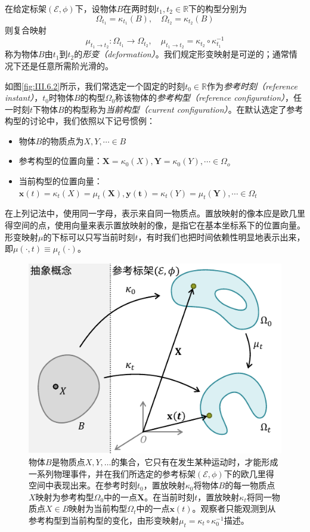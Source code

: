 \documentclass[main.tex]{subfiles}
\begin{document}
在给定标架$\left(\mathcal{E},\phi\right)$下，设物体$B$在两时刻$t_1,t_2\in\mathbb{R}$下的构型分别为
\[\Omega_{t_1}=\kappa_{t_1}\left(B\right),\quad\Omega_{t_2}=\kappa_{t_2}\left(B\right)\]
则复合映射
\[\mu_{t_1\to t_2}:\Omega_{t_1}\rightarrow\Omega_{t_2},\quad\mu_{t_1\to t_2}=\kappa_{t_2}\circ\kappa_{t_1}^{-1}\]
称为物体$B$由$t_1$到$t_2$的\emph{形变（deformation）}。我们规定形变映射是可逆的；通常情况下还是任意所需阶光滑的。

如图\ref{fig:III.6.2}所示，我们常选定一个固定的时刻$t_0\in\mathbb{R}$作为\emph{参考时刻（reference instant）}，$t_0$时物体$B$的构型$\Omega_0$称该物体的\emph{参考构型（reference configuration）}，任一时刻$t$下物体$B$的构型称为\emph{当前构型（current configuration）}。在默认选定了参考构型的讨论中，我们依照以下记号惯例：
\begin{itemize}
    \item 物体$B$的物质点为$X,Y,\cdots\in B$
    \item 参考构型的位置向量：$\mathbf{X}=\kappa_0\left(X\right),\mathbf{Y}=\kappa_0\left(Y\right),\cdots\in\Omega_o$
    \item 当前构型的位置向量：$\mathbf{x}\left(t\right)=\kappa_t\left(X\right)=\mu_t\left(\mathbf{X}\right),\mathbf{y\left(t\right)}=\kappa_t\left(Y\right)=\mu_t\left(\mathbf{Y}\right),\cdots\in\Omega_t$
\end{itemize}
在上列记法中，使用同一字母，表示来自同一物质点。置放映射的像本应是欧几里得空间的点，使用向量来表示置放映射的像，是指它在基本坐标系下的位置向量。形变映射$\mu$的下标可以只写当前时刻$t$，有时我们也把时间依赖性明显地表示出来，即$\mu\left(\cdot,t\right)\equiv\mu_t\left(\cdot\right)$。

\begin{figure}[ht]
    \centering
    \includegraphics{images/III.6.1.pdf}
    \caption{物体$B$是物质点$X,Y,\dots$的集合，它只有在发生某种运动时，才能形成一系列物理事件，并在我们所选定的参考标架$\left(\mathcal{E},\phi\right)$下的欧几里得空间中表现出来。在参考时刻$t_0$，置放映射$\kappa_0$将物体$B$的每一物质点$X$映射为参考构型$\Omega_0$中的一点$\mathbf{X}$。在当前时刻$t$，置放映射$\kappa_t$将同一物质点$X\in B$映射为当前构型$\Omega_t$中的一点$\mathbf{x}\left(t\right)$。观察者只能观测到从参考构型到当前构型的变化，由形变映射$\mu_t=\kappa_t\circ\kappa_0^{-1}$描述。}
    \label{fig:III.6.1}
\end{figure}
\end{document}
